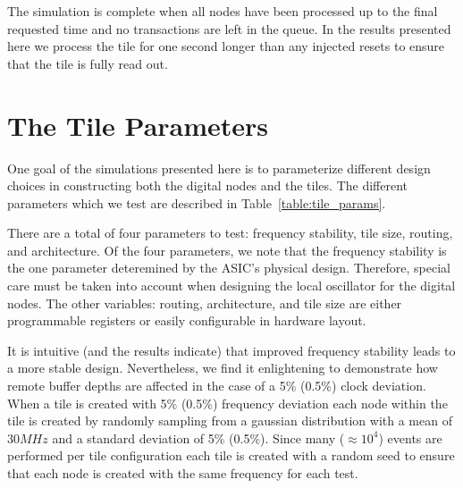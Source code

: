 The simulation is complete when all nodes have been processed up to the final requested time and no transactions are left in the queue. 
In the results presented here we process the tile for one second longer than any injected resets to ensure that the tile is fully read out.

\section{The Tile Parameters}

One goal of the simulations presented here is to parameterize different design choices in constructing both the digital nodes and the tiles.
The different parameters which we test are described in Table~\ref{table:tile_params}.

There are a total of four parameters to test: frequency stability, tile size, routing, and architecture.
Of the four parameters, we note that the frequency stability is the one parameter deteremined by the ASIC's physical design.
Therefore, special care must be taken into account when designing the local oscillator for the digital nodes.
The other variables: routing, architecture, and tile size are either programmable registers or easily configurable in hardware layout.

It is intuitive (and the results indicate) that improved frequency stability leads to a more stable design.
Nevertheless, we find it enlightening to demonstrate how remote buffer depths are affected in the case of a 5\% (0.5\%) clock deviation.
When a tile is created with 5\% (0.5\%) frequency deviation each node within the tile is created by randomly sampling from a gaussian distribution with a mean of 30$\unit{MHz}$ and a standard deviation of 5\% (0.5\%).
Since many ($\approx 10^4$) events are performed per tile configuration each tile is created with a random seed to ensure that each node is created with the same frequency for each test.

